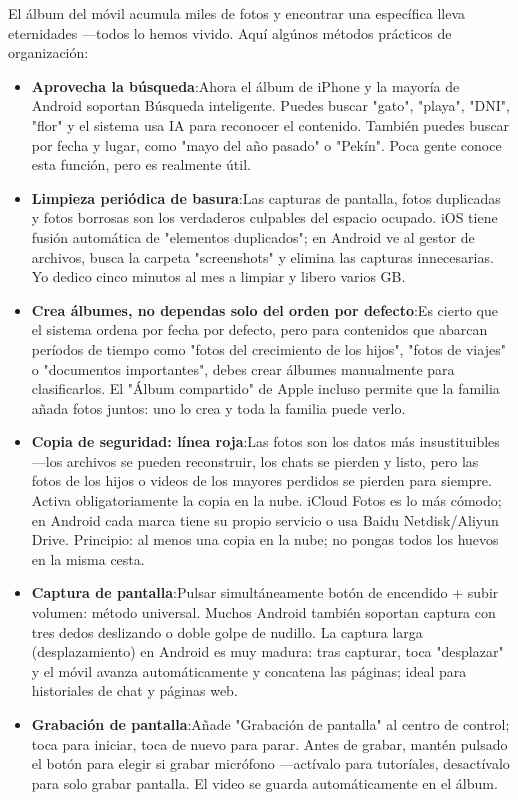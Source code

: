 
El álbum del móvil acumula miles de fotos y encontrar una específica lleva eternidades —todos lo hemos vivido. Aquí algúnos métodos prácticos de organización:

\begin{itemize}
  \item \textbf{Aprovecha la búsqueda}:Ahora el álbum de iPhone y la mayoría de Android soportan Búsqueda inteligente. Puedes buscar "gato", "playa", "DNI", "flor" y el sistema usa IA para reconocer el contenido. También puedes buscar por fecha y lugar, como "mayo del año pasado" o "Pekín". Poca gente conoce esta función, pero es realmente útil.
  \item \textbf{Limpieza periódica de basura}:Las capturas de pantalla, fotos duplicadas y fotos borrosas son los verdaderos culpables del espacio ocupado. iOS tiene fusión automática de "elementos duplicados"; en Android ve al gestor de archivos, busca la carpeta "screenshots" y elimina las capturas innecesarias. Yo dedico cinco minutos al mes a limpiar y libero varios GB.
  \item \textbf{Crea álbumes, no dependas solo del orden por defecto}:Es cierto que el sistema ordena por fecha por defecto, pero para contenidos que abarcan períodos de tiempo como "fotos del crecimiento de los hijos", "fotos de viajes" o "documentos importantes", debes crear álbumes manualmente para clasificarlos. El "Álbum compartido" de Apple incluso permite que la familia añada fotos juntos: uno lo crea y toda la familia puede verlo.
  \item \textbf{Copia de seguridad: línea roja}:Las fotos son los datos más insustituibles —los archivos se pueden reconstruir, los chats se pierden y listo, pero las fotos de los hijos o videos de los mayores perdidos se pierden para siempre. Activa obligatoriamente la copia en la nube. iCloud Fotos es lo más cómodo; en Android cada marca tiene su propio servicio o usa Baidu Netdisk/Aliyun Drive. Principio: al menos una copia en la nube; no pongas todos los huevos en la misma cesta.
\end{itemize}


\begin{itemize}
  \item \textbf{Captura de pantalla}:Pulsar simultáneamente botón de encendido + subir volumen: método universal. Muchos Android también soportan captura con tres dedos deslizando o doble golpe de nudillo. La captura larga (desplazamiento) en Android es muy madura: tras capturar, toca "desplazar" y el móvil avanza automáticamente y concatena las páginas; ideal para historiales de chat y páginas web.
  \item \textbf{Grabación de pantalla}:Añade "Grabación de pantalla" al centro de control; toca para iniciar, toca de nuevo para parar. Antes de grabar, mantén pulsado el botón para elegir si grabar micrófono —actívalo para tutoríales, desactívalo para solo grabar pantalla. El video se guarda automáticamente en el álbum.
\end{itemize}

